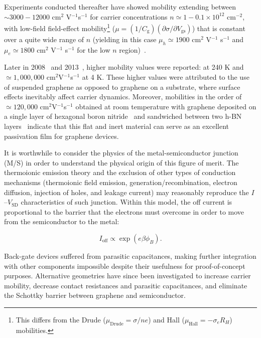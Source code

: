 Experiments conducted thereafter have showed mobility extending between $\sim 3000 - 12000$ cm$^2$ V$^{-1}$s$^{-1}$ for carrier concentrations $n\simeq1 - 0.1 \times 10^{12}$ cm$^{-2}$, with
low-field field-effect mobility\footnote[2]{This differs from the Drude ($\mu_{\textrm{Drude}}=\sigma/ne$) and Hall ($\mu_\textrm{Hall}=-\sigma_e R_H$) mobilities.} ($\mu = (1/C_{\textrm{g}})(\partial \sigma/\partial V_{\textrm{gs}})$)
that is constant over a quite wide range of $n$ (yielding in this case $\mu_h\simeq1900$ cm$^2$ V$^{-1}$ s$^{-1}$ and $\mu_e\simeq1800$ cm$^2$ V$^{-1}$ s$^{-1}$ for the low $n$ region)~\cite{Meric2008}.


Later in 2008~\cite{bolotin2008ultrahigh} and 2013~\cite{wang2013one}, higher mobility values were reported:  at 240 K and $\simeq1,000,000$ cm$^{2}$V$^{-1}$s$^{-1}$ at 4 K. These higher values were attributed to the use of suspended graphene as opposed to graphene on a substrate, where surface effects inevitably affect carrier dynamics. Moreover, mobilities in the order of $\simeq120,000$ cm$^{2}$V$^{-1}$s$^{-1}$ obtained at room temperature with graphene deposited on a single layer of hexagonal boron nitride~\cite{dean2010boron} and sandwiched between two h-BN layers~\cite{wang2013one} indicate that this flat and inert material can serve as an excellent passivation film for graphene devices.


It is worthwhile to consider the physics of the metal-semiconductor junction (M/S) in order to understand the physical origin of this figure of merit. The thermoionic emission theory and the exclusion of other types of conduction mechanisms (thermoionic field emission, generation/recombination, electron diffusion, injection of holes, and leakage current) may reasonably reproduce the $I$--$V_\textrm{SD}$ characteristics of such junction. Within this model, the off current is proportional to the barrier that the electrons must overcome in order to move from the semiconductor to the metal:

\begin{equation}
    I_\textrm{off}\propto\exp{(e\beta\phi_B)}.
\end{equation}


Back-gate devices suffered from parasitic capacitances, making further integration with other components impossible despite their usefulness for proof-of-concept purposes. Alternative geometries have since been investigated to increase carrier mobility, decrease contact resistances and parasitic capacitances, and eliminate the Schottky barrier between graphene and semiconductor.

